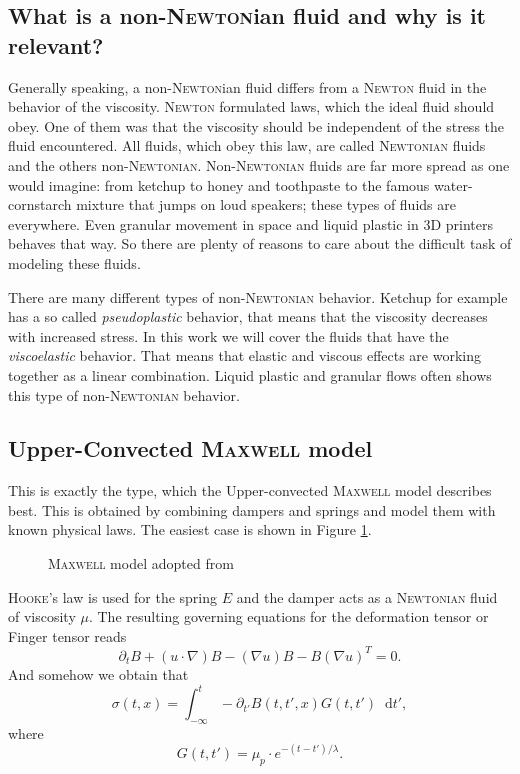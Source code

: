 \documentclass[12pt,a4paper,twoside, open=right]{scrreprt}
\theoremstyle{definition}
\theoremstyle{plain}
\newcommand{\D}{\mathop{}\!\mathrm{d}}
\begin{document}
\subsection{What is a non-\textsc{Newton}ian fluid and why is it relevant?}
Generally speaking, a non-\textsc{Newton}ian fluid differs from a \textsc{Newton} fluid in the behavior of the viscosity. \textsc{Newton} formulated laws, which the ideal fluid should obey. One of them was that the viscosity should be independent of the stress the fluid encountered. All fluids, which obey this law, are called \textsc{Newtonian} fluids and the others non-\textsc{Newtonian}. Non-\textsc{Newtonian} fluids are far more spread as one would imagine: from ketchup to honey and toothpaste to the famous water-cornstarch mixture that jumps on loud speakers; these types of fluids are everywhere. Even granular movement in space and liquid plastic in 3D printers behaves that way. So there are plenty of reasons to care about the difficult task of modeling these fluids. \par 
There are many different types of non-\textsc{Newtonian} behavior. Ketchup for example has a so called \emph{pseudoplastic} behavior, that means that the viscosity decreases with increased stress. In this work we will cover the fluids that have the \emph{viscoelastic }behavior. That means that elastic and viscous effects are working together as a linear combination. Liquid plastic and granular flows often shows this type of non-\textsc{Newtonian} behavior.
\subsection{Upper-Convected \textsc{Maxwell} model}
This is exactly the type, which the Upper-convected \textsc{Maxwell} model describes best. This is obtained by combining dampers and springs and model them with known physical laws. The easiest case is shown in Figure \ref{fig:maxwell}.
\begin{figure}
    \centering
    
    \def\svgwidth{0.5\textwidth}
    
    \caption[\textsc{Maxwell} model]{\textsc{Maxwell} model adopted from \cite{Pekaje}}
    \label{fig:maxwell}
    
\end{figure}
\textsc{Hooke}'s law is used for the spring $E$ and the damper acts as a \textsc{Newtonian} fluid of viscosity $\mu$. 
The resulting governing equations for the deformation tensor or Finger tensor reads
\begin{equation}
    \partial_t B + (u\cdot\nabla)B-(\nabla u)B-B(\nabla u)^T =0.
\end{equation}
And somehow we obtain that 
\begin{equation}
     \sigma(t,x) = \int_{-\infty}^t-\partial_{t'}B(t,t',x)G(t,t')\D t',
\end{equation}
where 
\begin{equation}
    G(t,t')=\mu_p\cdot e^{-(t-t')/\lambda}.
\end{equation}
\end{document}
